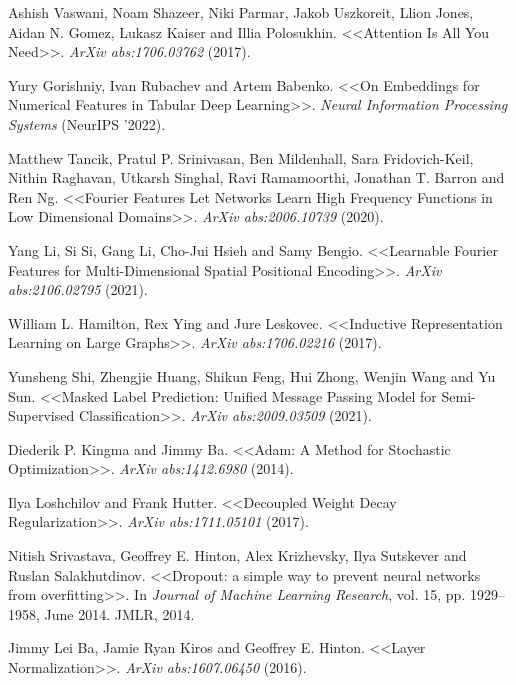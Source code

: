 \begin{thebibliography}{1}
 Ashish Vaswani, Noam Shazeer, Niki Parmar, Jakob Uszkoreit, Llion Jones, Aidan N. Gomez, Lukasz Kaiser and Illia Polosukhin. <<Attention Is All You Need>>. \textit{ArXiv abs:1706.03762} (2017).


 Yury Gorishniy, Ivan Rubachev and Artem Babenko. <<On Embeddings for Numerical Features in Tabular Deep Learning>>. \textit{Neural Information Processing Systems} (NeurIPS '2022).

 Matthew Tancik, Pratul P. Srinivasan, Ben Mildenhall, Sara Fridovich-Keil, Nithin Raghavan, Utkarsh Singhal, Ravi Ramamoorthi, Jonathan T. Barron and Ren Ng. <<Fourier Features Let Networks Learn High Frequency Functions in Low Dimensional Domains>>. \textit{ArXiv abs:2006.10739} (2020).

 Yang Li, Si Si, Gang Li, Cho-Jui Hsieh and Samy Bengio. <<Learnable Fourier Features for Multi-Dimensional Spatial Positional Encoding>>. \textit{ArXiv abs:2106.02795} (2021).

 William L. Hamilton, Rex Ying and Jure Leskovec. <<Inductive Representation Learning on Large Graphs>>.  \textit{ArXiv abs:1706.02216} (2017).

 Yunsheng Shi, Zhengjie Huang, Shikun Feng, Hui Zhong, Wenjin Wang and Yu Sun. <<Masked Label Prediction: Unified Message Passing Model for Semi-Supervised Classification>>. \textit{ArXiv abs:2009.03509} (2021).

 Diederik P. Kingma and Jimmy Ba. <<Adam: A Method for Stochastic Optimization>>. \textit{ArXiv abs:1412.6980} (2014).

 Ilya Loshchilov and Frank Hutter. <<Decoupled Weight Decay Regularization>>. \textit{ArXiv abs:1711.05101} (2017).

 Nitish Srivastava, Geoffrey E. Hinton, Alex Krizhevsky, Ilya Sutskever and Ruslan Salakhutdinov. <<Dropout: a simple way to prevent neural networks from overfitting>>. In \textit{Journal of Machine Learning Research}, vol. 15, pp. 1929--1958, June 2014. JMLR, 2014.

 Jimmy Lei Ba, Jamie Ryan Kiros and Geoffrey E. Hinton. <<Layer Normalization>>. \textit{ArXiv abs:1607.06450} (2016).


\end{thebibliography}
